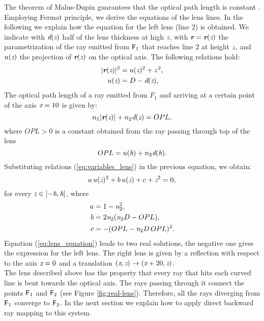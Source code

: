 The theorem of Malus-Dupin guarantees that the optical path length is constant \cite{greivenkamp2004field}. Employing Fermat principle, we derive the equations of the lens lines. In the following we explain how the equation for the left lens (line $2$) is obtained. We indicate with $\textit{d}(\textit{z})$ half of the lens thickness at high $\textit{z}$, with $\textit{\textbf{r}}=\textit{\textbf{r}}(\textit{z})$ the parametrization of the ray emitted from $\textsf{F}_1$ that reaches line $2$ at height $\textit{z}$, and $u(\textit{z})$ the projection of $\textit{\textbf{r}}(\textit{z})$ on the optical axis. 
The following relations hold:
\begin{equation}\label{eq:variables_lens}
\begin{aligned}
|\textit{\textbf{r}}(\textit{z})|^{2} &= u(\textit{z})^2+\textit{z}^{\,2},\\
u(\textit{z}) &= D-\textit{d}(\textit{z}), 
\end{aligned}
\end{equation}
The optical path length of a ray emitted from $F_1$ and arriving at a certain point of the axis $\textit{x}=10$ is given by:
\begin{equation}\label{eq:path_length}
n_1|\textit{\textbf{r}}(\textit{z})|+n_2\textit{d}(\textit{z})=OPL,
\end{equation}  
where $OPL>0$ is a constant obtained from the ray passing through top of the lens
\begin{equation}\label{eq:path_length2}
OPL = u(\textit{h})+n_2\textit{d}(\textit{h}).
\end{equation} Substituting relations (\ref{eq:variables_lens}) in the previous equation,
we obtain:
\begin{equation}\label{eq:lens_equation}
a\,u(\textit{z})^2+b\,u(\textit{z})+c+\textit{z}^2 = 0,
\end{equation}
for every $\textit{z}\in[-\textit{h}, \textit{h}]$, where 
\begin{equation}
\begin{aligned}
a & = 1-\textit{n}_2^2, \\
b & = 2\textit{n}_2(\textit{n}_2 D-OPL), \\
c & = -(OPL-\textit{n}_2 D\,OPL)^2. \\
\end{aligned}
\end{equation}
Equation (\ref{eq:lens_equation}) leads to two real solutions, the negative one gives the expression for the left lens.
The right lens is given by a reflection with respect to the axis $\textit{x}=0$ and a translation $(\textit{x}, \textit{z})\rightarrow (\textit{x}+20, \textit{z})$.
\\ \indent The lens described above has the property that every ray that hits each curved line is bent towards the optical axis. The rays passing through it connect the points $\textsf{F}_1 $ and $\textsf{F}_2$ (see Figure \ref{fig:real-lens}). Therefore, all the rays diverging from $\textsf{F}_1$ converge to $\textsf{F}_2$. In the next section we explain how to apply direct backward ray mapping to this system.

